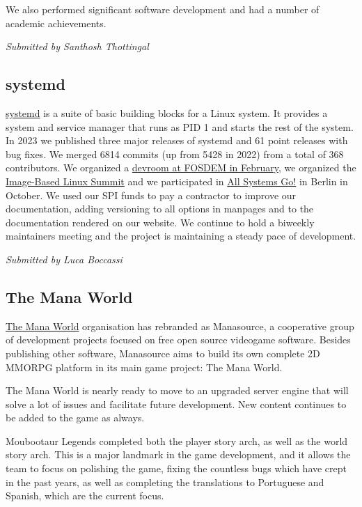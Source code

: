 \documentclass[a4paper]{report}
\begin{document}
We also performed significant software development and had a number of academic achievements.

{\em Submitted by Santhosh Thottingal}

\subsection{systemd}

\href{https://systemd.io/}{systemd} is a suite of basic building blocks for a Linux system. It provides a system and service manager that runs as PID 1 and starts the rest of the system. In 2023 we published three major releases of systemd and 61 point releases with bug fixes. We merged 6814 commits (up from 5428 in 2022) from a total of 368 contributors. We organized a \href{https://archive.fosdem.org/2023/schedule/track/image_based_linux_and_secure_measured_boot/}{devroom at FOSDEM in February}, we organized the \href{https://uapi-group.org/docs/minutes/2023-09-12__image-based-linux-summit/}{Image-Based Linux Summit} and we participated in \href{https://cfp.all-systems-go.io/all-systems-go-2023/schedule/}{All Systems Go!} in Berlin in October. We used our SPI funds to pay a contractor to improve our documentation, adding versioning to all options in manpages and to the documentation rendered on our website. We continue to hold a biweekly maintainers meeting and the project is maintaining a steady pace of development.

{\em Submitted by Luca Boccassi}

\subsection{The Mana World}

\href{https://www.themanaworld.org/about}{The Mana World} organisation has rebranded as Manasource, a cooperative group of development projects focused on free open source videogame software. Besides publishing other software, Manasource aims to build its own complete 2D MMORPG platform in its main game project: The Mana World.

The Mana World is nearly ready to move to an upgraded server engine that will solve a lot of issues and facilitate future development. New content continues to be added to the game as always.

Moubootaur Legends completed both the player story arch, as well as the world story arch. This is a major landmark in the game development, and it allows the team to focus on polishing the game, fixing the countless bugs which have crept in the past years, as well as completing the translations to Portuguese and Spanish, which are the current focus.
\end{document}
